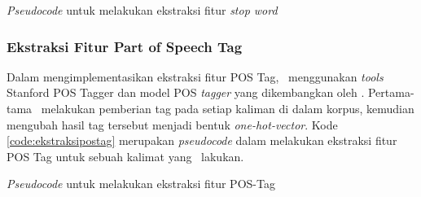 \begin{kode}
	
	
	
	\caption{\textit{Pseudocode} untuk melakukan ekstraksi fitur \textit{stop word}}
	\label{code:ekstraksistopword}	
\end{kode}

\subsubsection{Ekstraksi Fitur Part of Speech Tag}
Dalam mengimplementasikan ekstraksi fitur POS Tag, \saya~menggunakan \textit{tools} Stanford POS Tagger \citep{toutanova2000enriching} dan model POS \textit{tagger} yang dikembangkan oleh \cite{dinakaramani2014designing}. Pertama-tama \saya~melakukan pemberian tag pada setiap kaliman di dalam korpus, kemudian mengubah hasil tag tersebut menjadi bentuk \textit{one-hot-vector}. Kode \ref{code:ekstraksipostag} merupakan \textit{pseudocode} dalam melakukan ekstraksi fitur POS Tag untuk sebuah kalimat yang \saya~lakukan.

\begin{kode}
	
	
	\caption{\textit{Pseudocode} untuk melakukan ekstraksi fitur POS-Tag}
	\label{code:ekstraksipostag}
\end{kode}

